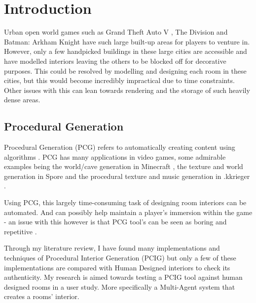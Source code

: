 \section{Introduction}
Urban open world games such as Grand Theft Auto V \cite{game:gta}, The Division \cite{game:division} and Batman: Arkham Knight \cite{game:arkham-knight} have such large built-up areas for players to venture in. However, only a few handpicked buildings in these large cities are accessible and have  modelled interiors leaving the others to be blocked off for decorative purposes. This could be resolved by modelling and designing each room in these cities, but this would become incredibly impractical due to time constraints. Other issues with this can lean towards rendering and the storage of such heavily dense areas.

\subsection*{Procedural Generation}
Procedural Generation (PCG) refers to automatically creating content using algorithms \cite{what-is-pcg}. PCG has many applications in video games, some admirable examples being the world/cave generation in Minecraft \cite{game:minecraft}, the texture\cite{game:spore-texture} and world generation\cite{game:spore-world} in Spore \cite{game:spore} and the procedural texture and music generation in .kkrieger \cite{game:kkreiger}.

Using PCG, this largely time-consuming task of designing room interiors can be automated. And can possibly help maintain a player's immersion within the game - an issue with this however is that PCG tool's can be seen as boring and repetitive \cite[Chapter~2]{pcg_in_gd}.

Through my literature review, I have found many implementations and techniques of Procedural Interior Generation (PCIG) but only a few of these implementations are compared with Human Designed interiors to check its authenticity. My research is aimed towards testing a PCIG tool against human designed rooms in a user study. More specifically a Multi-Agent system that creates a rooms' interior.

